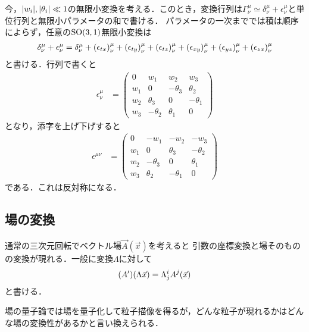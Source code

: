 今，$\abs{w_i}, \abs{\theta_i} \ll 1 $の無限小変換を考える．このとき，変換行列は$\Gamma^{\mu}_{\nu}\simeq \delta ^{\mu}_{\nu} + \epsilon^{\mu}_{\nu} $と単位行列と無限小パラメータの和で書ける．
パラメータの一次まででは積は順序によらず，任意の$\mathrm{SO}(3, 1)$無限小変換は
\begin{align}
		\delta^{\mu}_{\nu} + \epsilon^{\mu}_{\nu} = \delta^{\mu}_{\nu} + \qty(\epsilon_{tx})^{\mu}_{\nu}+ \qty(\epsilon_{ty})^{\mu}_{\nu}+ \qty(\epsilon_{tz})^{\mu}_{\nu}+ \qty(\epsilon_{xy})^{\mu}_{\nu}+ \qty(\epsilon_{yz})^{\mu}_{\nu}+ \qty(\epsilon_{zx})^{\mu}_{\nu}
\end{align}
と書ける．行列で書くと
\begin{align}
		\epsilon^{\mu}_{\nu}
		&=
		\begin{pmatrix}
				0 & w_1 & w_2 & w_3\\
				w_1 & 0 & -\theta_3 & \theta_2\\
				w_2 & \theta_3 & 0 & -\theta_1\\
				w_3 & -\theta_2 & \theta_1 & 0
		\end{pmatrix}
\end{align}
となり，添字を上げ下げすると
\begin{align}
		\epsilon^{\mu\nu}
		&=
		\begin{pmatrix}
				0 & -w_1 & -w_2 & -w_3\\
				w_1 & 0 & \theta_3 & -\theta_2\\
				w_2 & -\theta_3 & 0 & \theta_1\\
				w_3 & \theta_2 & -\theta_1 & 0
		\end{pmatrix}
\end{align}
である．これは反対称になる．


\subsection{場の変換}
通常の三次元回転でベクトル場$\vec{A}(\vec{x})$を考えると
引数の座標変換と場そのものの変換が現れる．一般に変換$\Lambda$に対して
\begin{align}
		\qty(A')(\Lambda \vec{x}) = \Lambda^{i}_{j}A^{j}(\vec{x})
\end{align}
と書ける．

場の量子論では場を量子化して粒子描像を得るが，どんな粒子が現れるかはどんな場の変換性があるかと言い換えられる．

